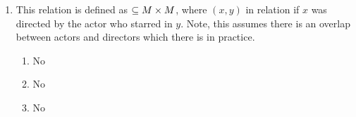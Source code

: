 \begin{questions}
\begin{solution}
\begin{enumerate}[label=(\alph*),itemsep=2pt,parsep=0pt,topsep=0pt,partopsep=0pt]
		\item This relation is defined as $\subseteq M \times M$, where $(x,y)$ in relation if $x$ was directed by the actor who starred in $y$.  Note, this assumes there is an overlap between actors and directors which there is in practice.
		\begin{enumerate}[label=(\roman*),itemsep=2pt,parsep=0pt,topsep=0pt,partopsep=0pt]
			\item No 
			\item No 
			\item No
		\end{enumerate}
    \end{enumerate}
    \end{solution}









\end{questions}
